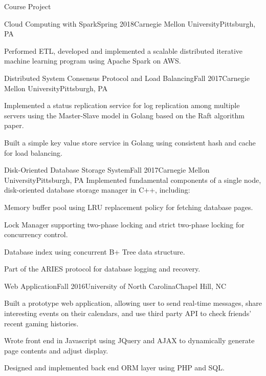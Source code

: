 \documentclass{resume} %
\begin{document}
\begin{rSection}{Course Project}

\begin{rSubsection}{Cloud Computing with Spark}{Spring 2018}{Carnegie Mellon University}{Pittsburgh, PA}{}
    \item Performed ETL, developed and implemented a scalable distributed iterative machine learning program using Apache Spark on AWS.
\end{rSubsection}

\begin{rSubsection}{Distributed System Consensus Protocol and Load Balancing}{Fall 2017}{Carnegie Mellon University}{Pittsburgh, PA}{}
\item Implemented a status replication service for log replication among multiple servers using the Master-Slave model
 in Golang based on the Raft algorithm paper.
\item Built a simple key value store service in Golang using consistent hash and cache for load balancing.
\end{rSubsection}


\begin{rSubsection}{Disk-Oriented Database Storage System}{Fall 2017}{Carnegie Mellon University}{Pittsburgh, PA}
{Implemented fundamental components of a single node, disk-oriented database storage manager in C++, including:}
\item Memory buffer pool using LRU replacement policy for fetching database pages.
\item Lock Manager supporting two-phase locking and strict two-phase locking for concurrency control.
\item Database index using concurrent B+ Tree data structure.
\item Part of the ARIES protocol for database logging and recovery.
\end{rSubsection}


\begin{rSubsection}{Web Application}{Fall 2016}{University of North Carolina}{Chapel Hill, NC}{}
\item Built a prototype web application, allowing user to send real-time messages, share interesting events on
 their calendars, and use third party API to check friends' recent gaming histories.
\item Wrote front end in Javascript using JQuery and AJAX to dynamically generate page contents and adjust display.
\item Designed and implemented back end ORM layer using PHP and SQL.
\end{rSubsection}

\end{rSection}
\end{document}
